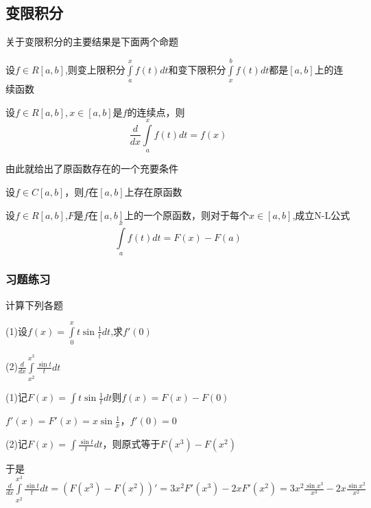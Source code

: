 \documentclass[lang=cn,10pt]{elegantbook}
\begin{document}
\subsection{变限积分}
关于变限积分的主要结果是下面两个命题
\begin{proposition}
	设$ f\in R[a,b]$,则变上限积分$\int\limits_a^x{f\left( t \right) dt}\text{和变下限积分}\int\limits_x^b{f\left( t \right) dt}$都是$[a,b]$上的连续函数
\end{proposition}
\begin{proposition}
	设$f\in R[a,b],x\in [a,b]$是$f$的连续点，则
	\begin{equation*}
		\frac{d}{dx}\int\limits_a^x{f\left( t \right) dt}=f\left( x \right) 
	\end{equation*}
\end{proposition}
由此就给出了原函数存在的一个充要条件\begin{proposition}[原函数存在定理]
	设$ f\in C[a,b]$，则$f$在$[a,b]$上存在原函数
\end{proposition}
\begin{proposition}
	设$ f\in R[a,b]$,$F$是$f$在$[a,b]$上的一个原函数，则对于每个$x$$\in [a,b]$,成立N-L公式
	\begin{equation*}
		\int\limits_a^x{f\left( t \right) dt}=F\left( x \right) -F\left( a \right)
	\end{equation*}
\end{proposition}
\subsubsection{习题练习}         
\begin{example}
	计算下列各题
	
	(1)设$f(x)=\int\limits_0^x{t\sin \frac{1}{t}dt}$,求$f'(0)$
	
	(2)$\frac{d}{dx}\int\limits_{x^2}^{x^3}{\frac{\sin t}{t}dt}$
	
\end{example}
\begin{solution}
	
	(1)记$F\left( x \right) =\int{t\sin \frac{1}{t}dt}$则$f\left( x \right) =F\left( x \right) -F\left( 0 \right) $
	
	$f\prime\left( x \right) =F\prime\left( x \right) =x\sin \frac{1}{x}$，$f'(0)=0$
	
	(2)记$F\left( x \right) =\int{\frac{\sin t}{t}dt}$，则原式等于$F\left( x^3 \right) -F\left( x^2 \right) $
	
	于是$\frac{d}{dx}\int\limits_{x^2}^{x^3}{\frac{\sin t}{t}dt}=\left( F\left( x^3 \right) -F\left( x^2 \right) \right) \prime=3x^2F\prime\left( x^3 \right) -2xF\prime\left( x^2 \right) =3x^2\frac{\sin x^3}{x^3}-2x\frac{\sin x^2}{x^2}
	$
\end{solution}
\end{document}

